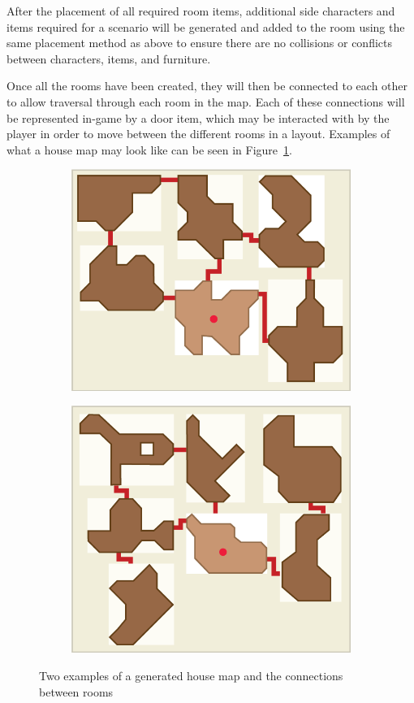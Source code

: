 After the placement of all required room items, additional side characters and items required for a scenario will be generated and added to the room using the same placement method as above to ensure there are no collisions or conflicts between characters, items, and furniture.

Once all the rooms have been created, they will then be connected to each other to allow traversal through each room in the map. Each of these connections will be represented in-game by a door item, which may be interacted with by the player in order to move between the different rooms in a layout. Examples of what a house map may look like can be seen in  Figure~\ref{fig:house_map_example}.

\begin{figure}[htb]
	\centering %
	\begin{subfigure}{.45\textwidth}
		\centering
		\includegraphics[width=.9\linewidth]{images/RoomGeneration_HouseMapExample1}
	\end{subfigure}%
	\begin{subfigure}{.45\textwidth}
		\centering
		\includegraphics[width=.9\linewidth]{images/RoomGeneration_HouseMapExample2}
	\end{subfigure}
	 \caption{Two examples of a generated house map and the connections between rooms}
	 \label{fig:house_map_example}
\end{figure}

